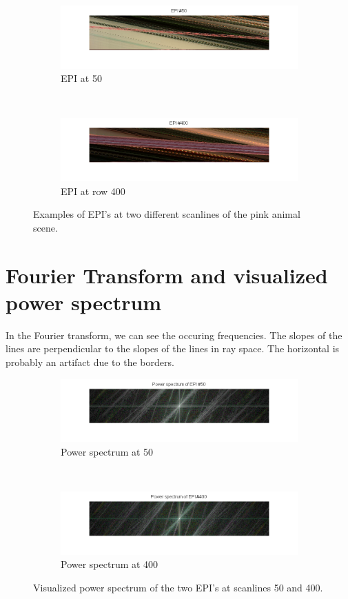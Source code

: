 \documentclass[a4paper]{article}
\begin{document}
\begin{figure}[ht]
	\vspace{3mm}
	\begin{subfigure}[h]{0.48\textwidth}
	  \includegraphics[width=\textwidth]{EPI50}
	  \caption*{EPI at 50}
	\end{subfigure}
    	~
	\begin{subfigure}[h]{0.48\textwidth}
	  \centering
	  \includegraphics[width=\textwidth]{EPI400}
	  \caption*{EPI at row 400}
	\end{subfigure}
\caption{Examples of EPI's at two different scanlines of the pink animal scene.}
\label{fig:EPIs}
\end{figure}
\section*{Fourier Transform and visualized power spectrum}
In the Fourier transform, we can see the occuring frequencies. The slopes of the lines are perpendicular to the slopes of the lines in ray space. The horizontal is probably an artifact due to the borders.
\begin{figure}[ht]
	\vspace{2mm}
	\begin{subfigure}[h]{0.48\textwidth}
	  \includegraphics[width=\textwidth]{powerSpec50}
	  \caption*{Power spectrum at 50}
	\end{subfigure}
    	~
	\begin{subfigure}[h]{0.48\textwidth}
	  \centering
	  \includegraphics[width=\textwidth]{powerSpec400}
	  \caption*{Power spectrum at 400}
	\end{subfigure}
\caption{Visualized power spectrum of the two EPI's at scanlines 50 and 400.}
\label{fig:powerSpectrum}
\end{figure}
\end{document}

